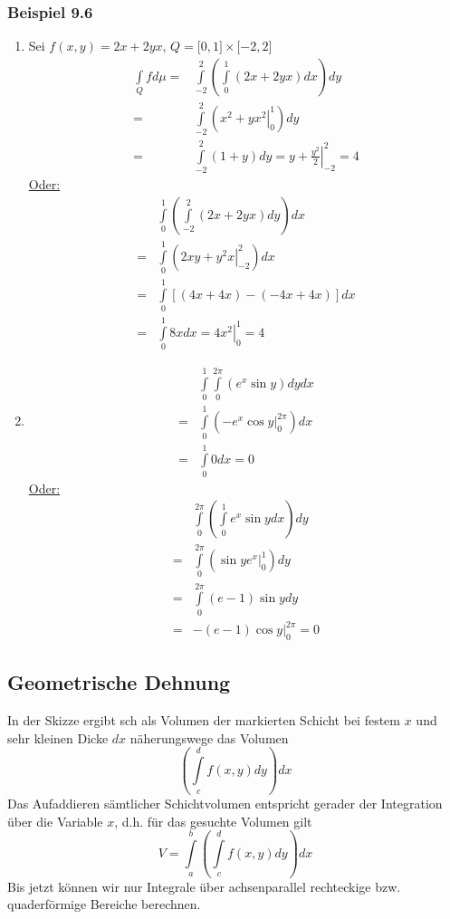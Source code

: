 \subsubsection*{Beispiel 9.6}
\begin{enumerate}
\item Sei $f\left( x,y\right)=2x+2yx$, $Q=\lbrack 0,1\rbrack\times\lbrack -2,2\rbrack$
\begin{align*}
\int\limits_Q {fd\mu }  =&\int\limits_{ - 2}^2 {\left( {\int\limits_0^1 {\left( {2x + 2yx} \right)dx} } \right)dy} \\
=&\int\limits_{ - 2}^2 {\left( {\left. {{x^2} + y{x^2}} \right|_0^1} \right)dy} \\
=&\int\limits_{ - 2}^2 {\left( {1 + y} \right)dy}  = \left. {y + \frac{{{y^2}}}{2}} \right|_{ - 2}^2 = 4
\end{align*}
\underline{Oder:}
\begin{align*}
&\int\limits_0^1 {\left( {\int\limits_{ - 2}^2 {\left( {2x + 2yx} \right)dy} } \right)dx} \\
 =&\int\limits_0^1 {\left( {\left. {2xy + {y^2}x} \right|_{ - 2}^2} \right)dx} \\
 =&\int\limits_0^1 {\left[ {\left( {4x + 4x} \right) - \left( { - 4x + 4x} \right)} \right]dx} \\
 =&\int\limits_0^1 {8xdx}  = \left. {4{x^2}} \right|_0^1 = 4
\end{align*}
\item \begin{align*}
&\int\limits_0^1 {\int\limits_0^{2\pi } {\left( {{e^x}\sin y} \right)dy} dx} \\
=&\int\limits_0^1 {\left( {\left. { - {e^x}\cos y} \right|_0^{2\pi }} \right)dx} \\
=&\int\limits_0^1 0 dx = 0
\end{align*}
\underline{Oder:}
\begin{align*}
&\int\limits_0^{2\pi } {\left( {\int\limits_0^1 {{e^x}\sin ydx} } \right)dy} \\
=&\int\limits_0^{2\pi } {\left( {\left. {\sin y{e^x}} \right|_0^1} \right)dy} \\
=&\int\limits_0^{2\pi } {\left( {e - 1} \right)\sin ydy} \\
=&\left. { - \left( {e - 1} \right)\cos y} \right|_0^{2\pi } = 0
\end{align*}
\end{enumerate}

\subsection*{Geometrische Dehnung}
In der Skizze ergibt sch als Volumen der markierten Schicht bei festem $x$ und sehr kleinen Dicke $dx$ näherungswege das Volumen \[\left( {\int\limits_c^d {f\left( {x,y} \right)dy} } \right)dx\] Das Aufaddieren sämtlicher Schichtvolumen entspricht gerader der Integration über die Variable $x$, d.h. für das gesuchte Volumen gilt \[V = \int\limits_a^b {\left( {\int\limits_c^d {f\left( {x,y} \right)dy} } \right)dx} \]
Bis jetzt können wir nur Integrale über achsenparallel rechteckige bzw. quaderförmige Bereiche berechnen.\\

